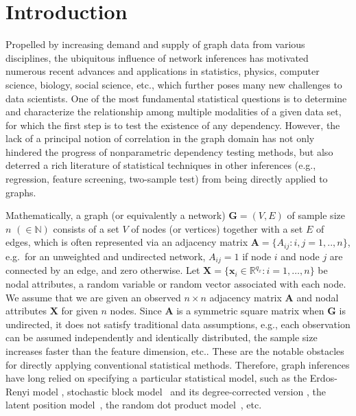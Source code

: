 \documentclass[11pt]{article}
\theoremstyle{definition}
\begin{document}
\sloppy
\doublespacing

\section{Introduction}
\label{sec:intro}
	\vspace*{-0.2cm}
Propelled by increasing demand and supply of graph data from various disciplines, the ubiquitous influence of network inferences has motivated numerous recent advances and applications in statistics, physics, computer science, biology, social science, etc., which further poses many new challenges to data scientists. One of the most fundamental statistical questions is to determine and characterize the relationship among multiple modalities of a given data set, for which the first step is to test the existence of any dependency. However, the lack of a principal notion of correlation in the graph domain has not only hindered the progress of nonparametric dependency testing methods, but also deterred a rich literature of statistical techniques in other inferences (e.g., regression, feature screening, two-sample test) from being directly applied to graphs.
 
Mathematically, a graph (or equivalently a network) $\mathbf{G}=(V,E)$ of sample size $n$ $(\in \mathbb{N})$ consists of a set $V$ of nodes (or vertices) together with a set $E$ of edges, which is often represented via an adjacency matrix $\mathbf{A} = \{A_{ij} : i,j= 1,..,n \}$, e.g.~for an unweighted and undirected network, $A_{ij} = 1$ if node $i$ and node $j$ are connected by an edge, and zero otherwise. Let $\mathbf{X} = \{  \mathbf{x}_{i} \in \mathbb{R}^{q_{x}} : i = 1, \ldots, n \}$ be nodal attributes, a random variable or random vector associated with each node. We assume that we are given an observed $n \times n$ adjacency matrix $\mathbf{A}$ and nodal attributes $\mathbf{X}$ for given $n$ nodes. Since $\mathbf{A}$ is a symmetric square matrix when $\mathbf{G}$ is undirected, it does not satisfy traditional data assumptions, e.g., each observation can be assumed independently and identically distributed, the sample size increases faster than the feature dimension, etc.. These are the notable obstacles for directly applying conventional statistical methods. Therefore, graph inferences have long relied on specifying a particular statistical model, such as the Erdos-Renyi model \cite{erdosrenyi1959,Gilbert1959}, stochastic block model~\cite{HollandEtAl1983, rohe2011spectral,SussmanEtAl2012,Lei2015} and its degree-corrected version \cite{karrer2011stochastic, ZhaoLevinaZhu2012}, the latent position model~\cite{TangSussmanPriebe2013,fosdick2015testing}, the random dot product model~\cite{YoungScheinerman2007, sussman2014consistent}, etc. 
\end{document}
